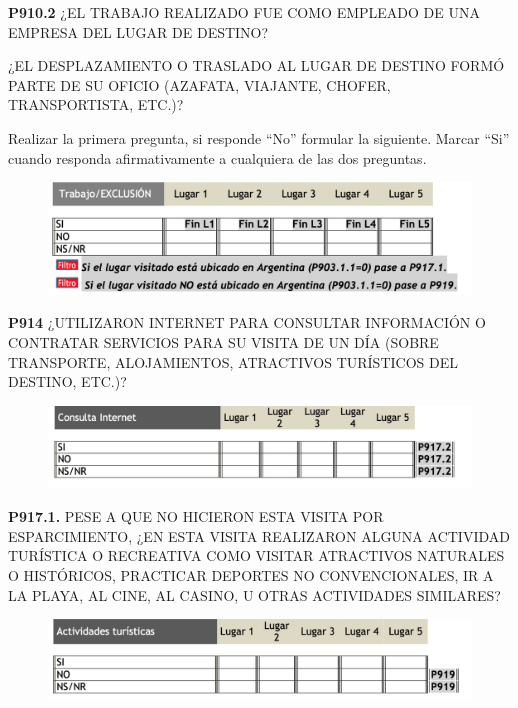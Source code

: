 \documentclass[
  openany]{book}
\begin{document}
\textbf{P910.2} ¿EL TRABAJO REALIZADO FUE COMO EMPLEADO DE UNA EMPRESA DEL LUGAR DE DESTINO?

¿EL DESPLAZAMIENTO O TRASLADO AL LUGAR DE DESTINO FORMÓ PARTE DE SU OFICIO (AZAFATA, VIAJANTE, CHOFER, TRANSPORTISTA, ETC.)?

Realizar la primera pregunta, si responde ``No'' formular la siguiente. Marcar ``Si'' cuando responda afirmativamente a cualquiera de las dos preguntas.

\begin{figure}

{\centering \includegraphics[width=1\linewidth]{imagenes/figura6-290} 

}

\end{figure}

\textbf{P914} ¿UTILIZARON INTERNET PARA CONSULTAR INFORMACIÓN O CONTRATAR SERVICIOS PARA SU VISITA DE UN DÍA (SOBRE TRANSPORTE, ALOJAMIENTOS, ATRACTIVOS TURÍSTICOS DEL DESTINO, ETC.)?

\begin{figure}

{\centering \includegraphics[width=1\linewidth]{imagenes/figura6-291} 

}

\end{figure}

\textbf{P917.1.} PESE A QUE NO HICIERON ESTA VISITA POR ESPARCIMIENTO, ¿EN ESTA VISITA REALIZARON ALGUNA ACTIVIDAD TURÍSTICA O RECREATIVA COMO VISITAR ATRACTIVOS NATURALES O HISTÓRICOS, PRACTICAR DEPORTES NO CONVENCIONALES, IR A LA PLAYA, AL CINE, AL CASINO, U OTRAS ACTIVIDADES SIMILARES?

\begin{figure}

{\centering \includegraphics[width=1\linewidth]{imagenes/figura6-292} 

}

\end{figure}
\end{document}
